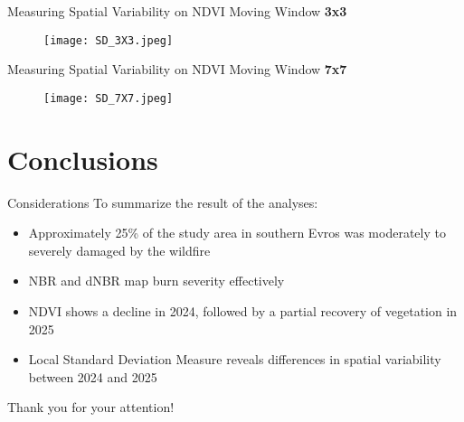 \documentclass{beamer}
\begin{document}
\begin{frame}{Measuring Spatial Variability on NDVI}
\centering
Moving Window \textbf{3x3}

\begin{figure}
        \centering
        \texttt{[image: SD\_3X3.jpeg]}
    \end{figure}  
\end{frame}

\begin{frame}{Measuring Spatial Variability on NDVI}
\centering
Moving Window \textbf{7x7} 

\begin{figure}
        \centering
        \texttt{[image: SD\_7X7.jpeg]}
    \end{figure}   
\end{frame}


\section{Conclusions}

\begin{frame}{Considerations}
To summarize the result of the analyses:
\bigskip
\begin{itemize} 
\item Approximately 25\% of the study area in southern Evros was moderately to severely damaged by the wildfire
    \bigskip
    \pause \item NBR and dNBR map burn severity effectively
    \bigskip
     \pause \item NDVI shows a decline in 2024, followed by a partial recovery of vegetation in 2025
    \bigskip
     \pause \item Local Standard Deviation Measure reveals differences in spatial variability between 2024 and 2025
   
\end{itemize}
\end{frame}

\begin{frame}
\centering
\large {Thank you for your attention!}
\end{frame}
\end{document}
